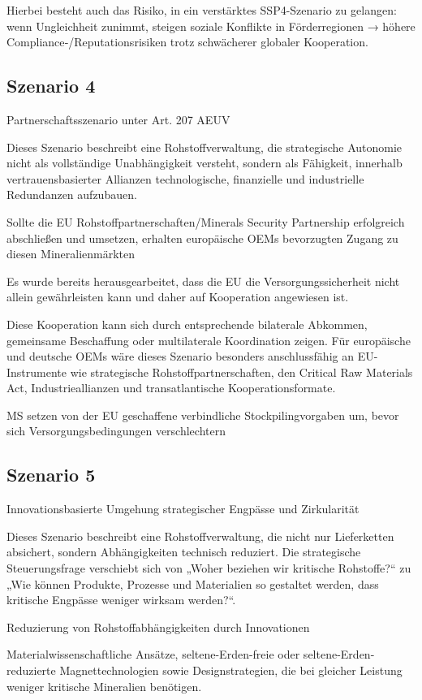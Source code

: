 \documentclass[12pt,a4paper,oneside]{book} %
\begin{document}
Hierbei besteht auch das Risiko, in ein verstärktes SSP4-Szenario zu gelangen: wenn Ungleichheit zunimmt, steigen soziale Konflikte in Förderregionen → höhere Compliance‑/Reputationsrisiken trotz schwächerer globaler Kooperation.

\subsection{Szenario 4}
Partnerschaftsszenario unter Art. 207 AEUV

Dieses Szenario beschreibt eine Rohstoffverwaltung, die strategische Autonomie nicht als vollständige Unabhängigkeit versteht, sondern als Fähigkeit, innerhalb vertrauensbasierter Allianzen technologische, finanzielle und industrielle Redundanzen aufzubauen.

Sollte die EU Rohstoffpartnerschaften/Minerals Security Partnership erfolgreich abschließen und umsetzen, erhalten europäische OEMs bevorzugten Zugang zu diesen Mineralienmärkten

Es wurde bereits herausgearbeitet, dass die EU die Versorgungssicherheit nicht allein gewährleisten kann und daher auf Kooperation angewiesen ist.

Diese Kooperation kann sich durch entsprechende bilaterale Abkommen, gemeinsame Beschaffung oder multilaterale Koordination zeigen. Für europäische und deutsche OEMs wäre dieses Szenario besonders anschlussfähig an EU-Instrumente wie strategische Rohstoffpartnerschaften, den Critical Raw Materials Act, Industrieallianzen und transatlantische Kooperationsformate.

MS setzen von der EU geschaffene verbindliche Stockpilingvorgaben um, bevor sich Versorgungsbedingungen verschlechtern

\subsection{Szenario 5}
Innovationsbasierte Umgehung strategischer Engpässe und Zirkularität

Dieses Szenario beschreibt eine Rohstoffverwaltung, die nicht nur Lieferketten absichert, sondern Abhängigkeiten technisch reduziert. Die strategische Steuerungsfrage verschiebt sich von „Woher beziehen wir kritische Rohstoffe?“ zu „Wie können Produkte, Prozesse und Materialien so gestaltet werden, dass kritische Engpässe weniger wirksam werden?“.

Reduzierung von Rohstoffabhängigkeiten durch Innovationen

Materialwissenschaftliche Ansätze,  seltene-Erden-freie oder seltene-Erden-reduzierte Magnettechnologien sowie Designstrategien, die bei gleicher Leistung weniger kritische Mineralien benötigen.
\end{document}
